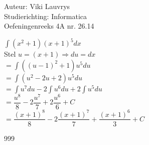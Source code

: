 \documentclass[a4paper]{article}
\begin{document}
  
\noindent \large Auteur: Viki	Lauvrys \\
\noindent \large Studierichting: Informatica\\
\noindent \large Oefeningenreeks 4A nr. 26.14\\

\medskip

\normalsize

$ \displaystyle\int(x^2+1)(x+1)^5 dx $ \\

Stel $u = (x+1) \Rightarrow du = dx $ \\

$ = \displaystyle\int((u-1)^2+1)u^5 du $ \\

$ = \displaystyle\int(u^2-2u+2)u^5 du$ \\

$ = \displaystyle\int u^7du -2\displaystyle\int u^6du + 2\displaystyle\int u^5du $ \\

$ = \dfrac{u^8}{8} -2\dfrac{u^7}{7} + 2\dfrac{u^6}{6}+ C $ \\

$ = \dfrac{(x+1)^8}{8} -2\dfrac{(x+1)^7}{7} + \dfrac{(x+1)^6}{3}+ C$

\begin{thebibliography}{999}
\end{thebibliography}
\end{document}
